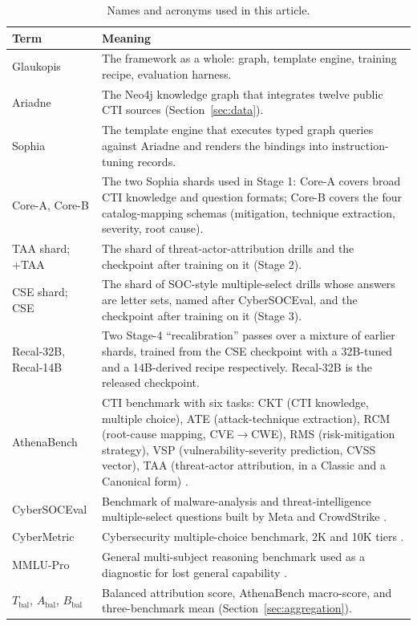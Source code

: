 \documentclass[a4paper,fleqn]{cas-dc}
\newcommand{\Abal}{A_{\mathrm{bal}}}
\newcommand{\Bbal}{B_{\mathrm{bal}}}
\newcommand{\Tbal}{T_{\mathrm{bal}}}
\begin{document}
\begin{table}
\centering\footnotesize
\caption{Names and acronyms used in this article.}\label{tab:glossary}
\begin{tabularx}{\textwidth}{@{}P{3.2cm}X@{}}
\toprule Term & Meaning \\\midrule
Glaukopis & The framework as a whole: graph, template engine, training recipe, evaluation harness. \\
Ariadne & The Neo4j knowledge graph that integrates twelve public CTI sources (Section~\ref{sec:data}). \\
Sophia & The template engine that executes typed graph queries against Ariadne and renders the bindings into instruction-tuning records. \\
Core-A, Core-B & The two Sophia shards used in Stage 1: Core-A covers broad CTI knowledge and question formats; Core-B covers the four catalog-mapping schemas (mitigation, technique extraction, severity, root cause). \\
TAA shard; +TAA & The shard of threat-actor-attribution drills and the checkpoint after training on it (Stage 2). \\
CSE shard; CSE & The shard of SOC-style multiple-select drills whose answers are letter sets, named after CyberSOCEval, and the checkpoint after training on it (Stage 3). \\
Recal-32B, Recal-14B & Two Stage-4 ``recalibration'' passes over a mixture of earlier shards, trained from the CSE checkpoint with a 32B-tuned and a 14B-derived recipe respectively. Recal-32B is the released checkpoint. \\
AthenaBench & CTI benchmark with six tasks: CKT (CTI knowledge, multiple choice), ATE (attack-technique extraction), RCM (root-cause mapping, CVE$\to$CWE), RMS (risk-mitigation strategy), VSP (vulnerability-severity prediction, CVSS vector), TAA (threat-actor attribution, in a Classic and a Canonical form) \citep{alam2025athenabench}. \\
CyberSOCEval & Benchmark of malware-analysis and threat-intelligence multiple-select questions built by Meta and CrowdStrike \citep{deason2025cybersoceval}. \\
CyberMetric & Cybersecurity multiple-choice benchmark, 2K and 10K tiers \citep{tihanyi2024cybermetric}. \\
MMLU-Pro & General multi-subject reasoning benchmark used as a diagnostic for lost general capability \citep{wang2024mmlupro}. \\
$\Tbal$, $\Abal$, $\Bbal$ & Balanced attribution score, AthenaBench macro-score, and three-benchmark mean (Section~\ref{sec:aggregation}). \\
\bottomrule
\end{tabularx}
\end{table}
\end{document}
